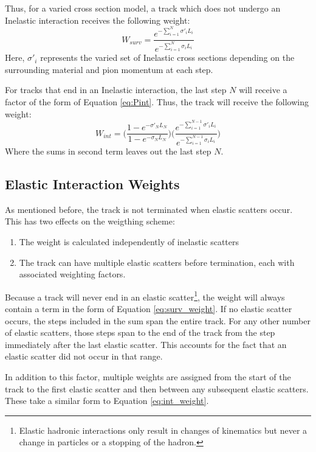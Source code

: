 \documentclass[12pt]{article}
\begin{document}
Thus, for a varied cross section model, a track which does not undergo an Inelastic interaction receives the following weight:
\begin{equation}\label{eq:surv_weight}
  W_{surv} = \frac{e^{- \sum \limits_{i=1}^{N} \sigma'_i L_i}}{e^{- \sum \limits_{i=1}^{N} \sigma_i L_i}}
\end{equation}
Here, $\sigma'_i$ represents the varied set of Inelastic cross sections depending on the surrounding material and pion momentum at each step.

For tracks that end in an Inelastic interaction, the last step $N$ will receive a factor of the form of Equation \ref{eq:Pint}. Thus, the track will receive the following weight: 
\begin{equation}\label{eq:int_weight}
  W_{int} = \Bigg( \frac{1 - e^{-\sigma'_{N}L_N}}{1 - e^{-\sigma_{N}L_N}} \Bigg) 
\Bigg( \frac{e^{- \sum \limits_{i=1}^{N-1} \sigma'_i L_i}}{e^{- \sum \limits_{i=1}^{N-1} \sigma_i L_i}} \Bigg)
\end{equation}
Where the sums in second term leaves out the last step $N$. 

\subsection{Elastic Interaction Weights}
As mentioned before, the track is not terminated when elastic scatters occur. This has two effects on the weigthing scheme:
\begin{enumerate}
\item The weight is calculated independently of inelastic scatters
\item The track can have multiple elastic scatters before termination, each with associated weighting factors. 
\end{enumerate}

Because a track will never end in an elastic scatter\footnote{Elastic hadronic interactions only result in changes of kinematics but never a change in particles or a stopping of the hadron.}, the weight will always contain a term in the form of Equation \ref{eq:surv_weight}. If no elastic scatter occurs, the steps included in the sum span the entire track. For any other number of elastic scatters, those steps span to the end of the track from the step immediately after the last elastic scatter. This accounts for the fact that an elastic scatter did not occur in that range. 

In addition to this factor, multiple weights are assigned from the start of the track to the first elastic scatter and then between any subsequent elastic scatters. These take a similar form to Equation \ref{eq:int_weight}.
\end{document}
